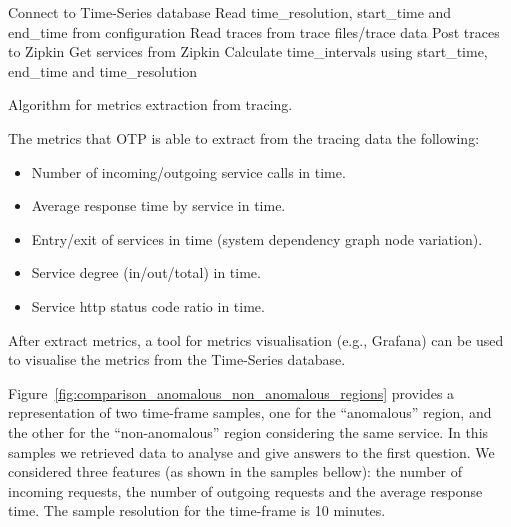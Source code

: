 \begin{algorithm}
  Connect to Time-Series database\;
  Read time\_resolution, start\_time and end\_time from configuration\;
  Read traces from trace files/trace data\;
  Post traces to Zipkin\;
  Get services from Zipkin\;
  Calculate time\_intervals using start\_time, end\_time and time\_resolution\;
  \caption{Algorithm for metrics extraction from tracing.}
  \label{alg:metrics_extraction_from_tracing}
\end{algorithm}

The metrics that OTP is able to extract from the tracing data the following:

\begin{itemize}
  \item Number of incoming/outgoing service calls in time.
  \item Average response time by service in time.
  \item Entry/exit of services in time (system dependency graph node variation).
  \item Service degree (in/out/total) in time.
  \item Service http status code ratio in time.
\end{itemize}

After extract metrics, a tool for metrics visualisation (e.g., Grafana) can be used to visualise the metrics from the Time-Series database.

Figure~\ref{fig:comparison_anomalous_non_anomalous_regions} provides a representation of two time-frame samples, one for the ``anomalous'' region, and the other for the ``non-anomalous'' region considering the same service. In this samples we retrieved data to analyse and give answers to the first question. We considered three features (as shown in the samples bellow): the number of incoming requests, the number of outgoing requests and the average response time. The sample resolution for the time-frame is 10 minutes.

